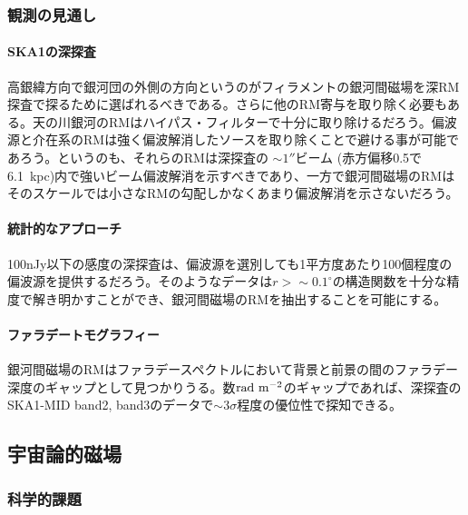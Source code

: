 \subsubsection{観測の見通し}
\label{c06.s2.ss6.sss2}

\paragraph{SKA1の深探査}

高銀緯方向で銀河団の外側の方向というのがフィラメントの銀河間磁場を深RM探査で探るために選ばれるべきである。さらに他のRM寄与を取り除く必要もある。天の川銀河のRMはハイパス・フィルターで十分に取り除けるだろう\citep{2014ApJ...790..123A}。偏波源と介在系のRMは強く偏波解消したソースを取り除くことで避ける事が可能であろう。というのも、それらのRMは深探査の $\sim 1''$ビーム (赤方偏移0.5で6.1~kpc)内で強いビーム偏波解消を示すべきであり、一方で銀河間磁場のRMはそのスケールでは小さなRMの勾配しかなくあまり偏波解消を示さないだろう。

\paragraph{統計的なアプローチ}

100nJy以下の感度の深探査は、偏波源を選別しても1平方度あたり100個程度の偏波源を提供するだろう。そのようなデータは$r > \sim 0.1^\circ$の構造関数を十分な精度で解き明かすことができ\citep{2014ApJ...790..123A}、銀河間磁場のRMを抽出することを可能にする。

\paragraph{ファラデートモグラフィー}

銀河間磁場のRMはファラデースペクトルにおいて背景と前景の間のファラデー深度のギャップとして見つかりうる\citep{2014PASJ...66...65A}。数${\rm rad~m^{-2}}$のギャップであれば、深探査のSKA1-MID band2, band3のデータで$\sim 3\sigma$程度の優位性で探知できる\citep{2014PASJ...66....5I}。


\subsection{宇宙論的磁場}
\label{c06.s2.ss7}

\subsubsection{科学的課題}
\label{c06.s2.ss7.sss1}

